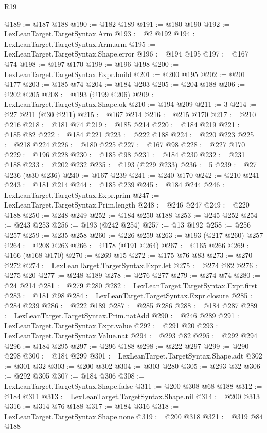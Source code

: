 \begin{lexlean}{R19}
\begin{coremodule}
@189 := @187 @188
@190 := @182 @189
@191 := @180 @190
@192 := LexLeanTarget.TargetSyntax.Arm
@193 := @2 @192
@194 := LexLeanTarget.TargetSyntax.Arm.arm
@195 := LexLeanTarget.TargetSyntax.Shape.error
@196 := @194 @195
@197 := @167 @74
@198 := @197 @170
@199 := @196 @198
@200 := LexLeanTarget.TargetSyntax.Expr.build
@201 := @200 @195
@202 := @201 @177
@203 := @185 @74
@204 := @184 @203
@205 := @204 @188
@206 := @202 @205
@208 := @193 (@199 @206)
@209 := LexLeanTarget.TargetSyntax.Shape.ok
@210 := @194 @209
@211 := 3
@214 := @27 @211 (@30 @211)
@215 := @167 @214
@216 := @215 @170
@217 := @210 @216
@218 := @181 @74
@219 := @185 @214
@220 := @184 @219
@221 := @185 @82
@222 := @184 @221
@223 := @222 @188
@224 := @220 @223
@225 := @218 @224
@226 := @180 @225
@227 := @167 @98
@228 := @227 @170
@229 := @196 @228
@230 := @185 @98
@231 := @184 @230
@232 := @231 @188
@233 := @202 @232
@235 := @193 (@229 @233)
@236 := 5
@239 := @27 @236 (@30 @236)
@240 := @167 @239
@241 := @240 @170
@242 := @210 @241
@243 := @181 @214
@244 := @185 @239
@245 := @184 @244
@246 := LexLeanTarget.TargetSyntax.Expr.prim
@247 := LexLeanTarget.TargetSyntax.Prim.length
@248 := @246 @247
@249 := @220 @188
@250 := @248 @249
@252 := @184 @250 @188
@253 := @245 @252
@254 := @243 @253
@256 := @193 (@242 @254)
@257 := @13 @192
@258 := @256 @257
@259 := @235 @258
@260 := @226 @259
@263 := @193 (@217 @260) @257
@264 := @208 @263
@266 := @178 (@191 @264)
@267 := @165 @266
@269 := @166 (@168 @170)
@270 := @269 @15
@272 := @175 @76 @83
@273 := @270 @272
@274 := LexLeanTarget.TargetSyntax.Expr.let
@275 := @274 @82
@276 := @275 @20
@277 := @248 @189
@278 := @276 @277
@279 := @274 @74
@280 := @24 @214
@281 := @279 @280
@282 := LexLeanTarget.TargetSyntax.Expr.first
@283 := @181 @98
@284 := LexLeanTarget.TargetSyntax.Expr.closure
@285 := @284 @239
@286 := @222 @189
@287 := @285 @286
@288 := @184 @287
@289 := LexLeanTarget.TargetSyntax.Prim.natAdd
@290 := @246 @289
@291 := LexLeanTarget.TargetSyntax.Expr.value
@292 := @291 @20
@293 := LexLeanTarget.TargetSyntax.Value.nat
@294 := @293 @82
@295 := @292 @294
@296 := @184 @295
@297 := @296 @188
@298 := @222 @297
@299 := @290 @298
@300 := @184 @299
@301 := LexLeanTarget.TargetSyntax.Shape.adt
@302 := @301 @32
@303 := @200 @302
@304 := @303 @280
@305 := @293 @32
@306 := @292 @305
@307 := @184 @306
@308 := LexLeanTarget.TargetSyntax.Shape.false
@311 := @200 @308 @68 @188
@312 := @184 @311
@313 := LexLeanTarget.TargetSyntax.Shape.nil
@314 := @200 @313
@316 := @314 @76 @188
@317 := @184 @316
@318 := LexLeanTarget.TargetSyntax.Shape.none
@319 := @200 @318
@321 := @319 @84 @188

\end{coremodule}
\end{lexlean}
